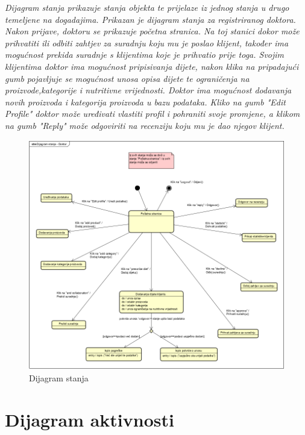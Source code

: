 		\textit{Dijagram stanja prikazuje stanja objekta te prijelaze iz jednog stanja u drugo temeljene na dogadajima. Prikazan je dijagram stanja za registriranog
			doktora. Nakon prijave, doktoru se prikazuje početna stranica. Na toj stanici dokor može prihvatiti ili odbiti zahtjev za suradnju koju mu je poslao klijent, također ima mogućnost prekida suradnje s klijentima koje je prihvatio prije toga. Svojim klijentima doktor ima mogućnost pripisivanja dijete, nakon klika na pripadajući gumb pojavljuje se mogućnost unosa opisa dijete te ograničenja na proizvode,kategorije i nutritivne vrijednosti. Doktor ima mogućnost dodavanja novih proizvoda i kategorija proizvoda u bazu podataka. Kliko na gumb "Edit Profile" doktor može uređivati vlastiti profil i pohraniti svoje promjene, a klikom na gumb "Reply" može odgoviriti na recenziju koju mu je dao njegov klijent. }
		
		\begin{figure}
			\centering
			\includegraphics[scale=0.8]{dijagrami/DijagramStanjaDobar.PNG}
			\caption{Dijagram stanja}
		\end{figure}
		\eject 
		
		
		
		
		
		
		\section{Dijagram aktivnosti}
		
